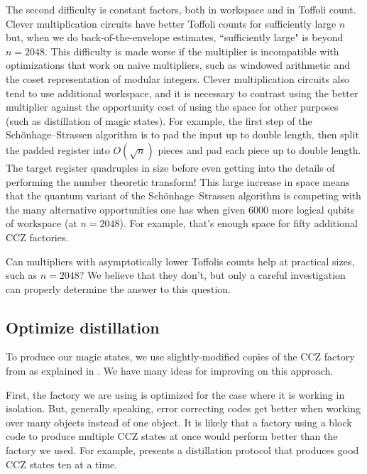 \documentclass[superscriptaddress,notitlepage,longbibliography]{revtex4-1}
\theoremstyle{definition}
\theoremstyle{definition}
\begin{document}
The second difficulty is constant factors, both in workspace and in Toffoli count.
Clever multiplication circuits have better Toffoli counts for sufficiently large $n$ but, when we do back-of-the-envelope estimates, ``sufficiently large" is beyond $n=2048$.
This difficulty is made worse if the multiplier is incompatible with optimizations that work on naive multipliers, such as windowed arithmetic and the coset representation of modular integers.
Clever multiplication circuits also tend to use additional workspace, and it is necessary to contrast using the better multiplier against the opportunity cost of using the space for other purposes (such as distillation of magic states).
For example, the first step of the Schönhage–Strassen algorithm is to pad the input up to double length, then split the padded register into $O(\sqrt{n})$ pieces and pad each piece up to double length.
The target register quadruples in size before even getting into the details of performing the number theoretic transform!
This large increase in space means that the quantum variant of the Schönhage–Strassen algorithm is competing with the many alternative opportunities one has when given 6000 more logical qubits of workspace (at $n=2048$).
For example, that's enough space for fifty additional CCZ factories.

Can multipliers with asymptotically lower Toffolis counts help at practical sizes, such as $n=2048$?
We believe that they don't, but only a careful investigation can properly determine the answer to this question.



\subsection{Optimize distillation}

To produce our magic states, we use slightly-modified copies of the CCZ factory from \cite{gidney2018magic} as explained in \cite{gidney2019autoccz}.
We have many ideas for improving on this approach.

First, the factory we are using is optimized for the case where it is working in isolation.
But, generally speaking, error correcting codes get better when working over many objects instead of one object.
It is likely that a factory using a block code to produce multiple CCZ states at once would perform better than the factory we used.
For example, \cite{haah2018codes} presents a distillation protocol that produces good CCZ states ten at a time.
\end{document}
